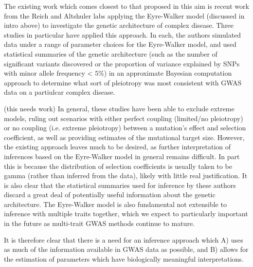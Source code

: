 \documentclass[11pt]{article}
\newcommand{\jb}[1]{{\color{blue} (#1)} }
\begin{document}
The existing work which comes closest to that proposed in this aim is recent work from the Reich and Altshuler labs applying the Eyre-Walker model (discussed in intro above) to investigate the genetic architecture of complex disease. Three studies in particular have applied this approach\cite{Agarwala:2013bu, Fuchsberger:2016df,Mancuso:2015cp}. In each, the authors simulated data under a range of parameter choices for the Eyre-Walker model, and used statistical summaries of the genetic architecture (such as the number of significant variants discovered or the proportion of variance explained by SNPs with minor allele frequency < $5\%$) in an approximate Bayesian computation approach to determine what sort of pleiotropy was most consistent with GWAS data on a partiulcar complex disease.

\jb{this needs work}
In general, these studies have been able to exclude extreme models, ruling out scenarios with either perfect coupling (limited/no pleiotropy) or no coupling (i.e. extreme pleiotropy) between a mutation's effect and selection coefficient, as well as providing estimates of the mutational target size. However, the existing approach leaves much to be desired, as further interpretation of inferences based on the Eyre-Walker model in general remains difficult. In part this is because the distribution of selection coefficients is usually taken to be gamma (rather than inferred from the data), likely with little real justification\cite{EyreWalker:2007dl,Racimo:2014cb}. It is also clear that the statistical summaries used for inference by these authors discard a great deal of potentially useful information about the genetic architecture. The Eyre-Walker model is also fundamental not extensible to inference with multiple traits together, which we expect to particularly important in the future as multi-trait GWAS methods continue to mature.\cite{PickrellPairwise,SomeMatthewStephensPaper}

It is therefore clear that there is a need for an inference approach which A) uses as much of the information available in GWAS data as possible, and B) allows for the estimation of parameters which have biologically meaningful interpretations. 
\end{document}

